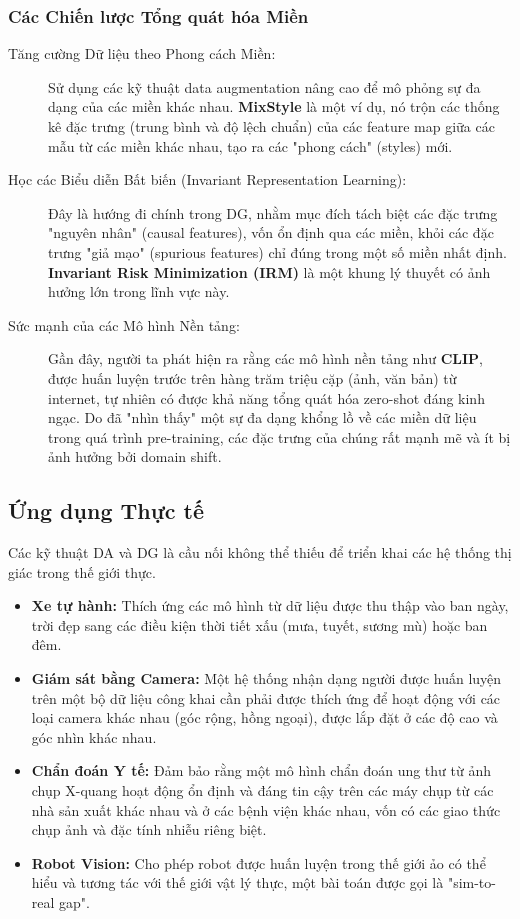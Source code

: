 \subsubsection{Các Chiến lược Tổng quát hóa Miền}
\label{subsubsec:dg_strategies}
\begin{description}
	\item[Tăng cường Dữ liệu theo Phong cách Miền:] Sử dụng các kỹ thuật data augmentation nâng cao để mô phỏng sự đa dạng của các miền khác nhau. \textbf{MixStyle} \cite{Zhou2021} là một ví dụ, nó trộn các thống kê đặc trưng (trung bình và độ lệch chuẩn) của các feature map giữa các mẫu từ các miền khác nhau, tạo ra các "phong cách" (styles) mới.
	\item[Học các Biểu diễn Bất biến (Invariant Representation Learning):] Đây là hướng đi chính trong DG, nhằm mục đích tách biệt các đặc trưng "nguyên nhân" (causal features), vốn ổn định qua các miền, khỏi các đặc trưng "giả mạo" (spurious features) chỉ đúng trong một số miền nhất định. \textbf{Invariant Risk Minimization (IRM)} là một khung lý thuyết có ảnh hưởng lớn trong lĩnh vực này.
	\item[Sức mạnh của các Mô hình Nền tảng:] Gần đây, người ta phát hiện ra rằng các mô hình nền tảng như \textbf{CLIP}, được huấn luyện trước trên hàng trăm triệu cặp (ảnh, văn bản) từ internet, tự nhiên có được khả năng tổng quát hóa zero-shot đáng kinh ngạc. Do đã "nhìn thấy" một sự đa dạng khổng lồ về các miền dữ liệu trong quá trình pre-training, các đặc trưng của chúng rất mạnh mẽ và ít bị ảnh hưởng bởi domain shift.
\end{description}

\subsection{Ứng dụng Thực tế}
\label{subsec:da_dg_applications}
Các kỹ thuật DA và DG là cầu nối không thể thiếu để triển khai các hệ thống thị giác trong thế giới thực.
\begin{itemize}
	\item \textbf{Xe tự hành:} Thích ứng các mô hình từ dữ liệu được thu thập vào ban ngày, trời đẹp sang các điều kiện thời tiết xấu (mưa, tuyết, sương mù) hoặc ban đêm.
	\item \textbf{Giám sát bằng Camera:} Một hệ thống nhận dạng người được huấn luyện trên một bộ dữ liệu công khai cần phải được thích ứng để hoạt động với các loại camera khác nhau (góc rộng, hồng ngoại), được lắp đặt ở các độ cao và góc nhìn khác nhau.
	\item \textbf{Chẩn đoán Y tế:} Đảm bảo rằng một mô hình chẩn đoán ung thư từ ảnh chụp X-quang hoạt động ổn định và đáng tin cậy trên các máy chụp từ các nhà sản xuất khác nhau và ở các bệnh viện khác nhau, vốn có các giao thức chụp ảnh và đặc tính nhiễu riêng biệt.
	\item \textbf{Robot Vision:} Cho phép robot được huấn luyện trong thế giới ảo có thể hiểu và tương tác với thế giới vật lý thực, một bài toán được gọi là "sim-to-real gap".
\end{itemize}

